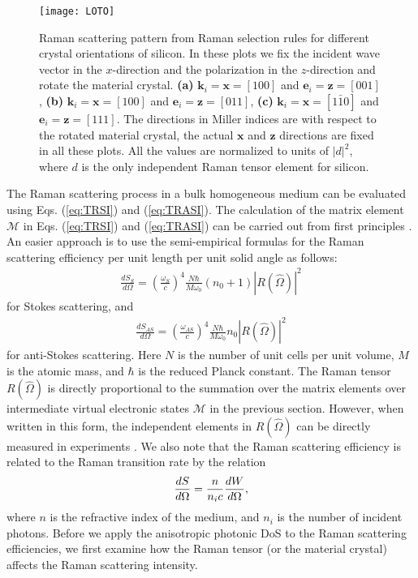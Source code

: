 \documentclass[%
 reprint,
superscriptaddress,
 amsmath,amssymb,
 aps,
pra,
]{revtex4-1}
\newcommand{\mb}[1]{\mathbf{#1}} %
\begin{document}
\begin{figure*}[!ht]
\begin{center}
\texttt{[image: LOTO]}
\caption{Raman scattering pattern from Raman selection rules for different crystal orientations of silicon. In these plots we fix the incident wave vector in the $x$-direction and the polarization in the $z$-direction and rotate the material crystal. \textbf{(a)} $\mb{k}_i=\mb{x}=[100]$ and $\mb{e}_i=\mb{z}=[001]$,
\textbf{(b)} $\mb{k}_i=\mb{x}=[100]$ and $\mb{e}_i=\mb{z}=[011]$,
\textbf{(c)} $\mb{k}_i=\mb{x}=[1\bar{1}0]$ and $\mb{e}_i=\mb{z}=[111]$. The directions in Miller indices are with respect to the rotated material crystal, the actual $\mb{x}$ and $\mb{z}$ directions are fixed in all these plots. All the values are normalized to units of $|d|^2$, where $d$ is the only independent Raman tensor element for silicon.}
\label{fig:LOTO}
\end{center}
\end{figure*}




The Raman scattering process in a bulk homogeneous medium can be evaluated using Eqs. (\ref{eq:TRSI}) and (\ref{eq:TRASI}). The calculation of the matrix element $\mathcal{M}$ in Eqs. (\ref{eq:TRSI}) and (\ref{eq:TRASI}) can be carried out from first principles \cite{deinzer2002raman,lazzeri2003first}. An easier approach is to use the semi-empirical formulas for the Raman scattering efficiency per unit length per unit solid angle \cite{aggarwal2011measurement,chen2015raman,wagner1983absolute} as follows:
\begin{align}\label{eq:dSdOS}
\frac{d S_S}{d\Omega}
	=\left (\frac{\omega_S}{c} \right )^4
	\frac{N\hbar}{M\omega_0}(n_0+1)
	|R(\hat{\Omega})|^2
\end{align}
for Stokes scattering, and
\begin{align}\label{eq:dSdOAS}
\frac{d S_{AS}}{d\Omega}
	=\left (\frac{\omega_{AS}}{c} \right )^4
	\frac{N\hbar}{M\omega_0}n_0
	|R(\hat{\Omega})|^2
\end{align}
for anti-Stokes scattering. Here $N$ is the number of unit cells per unit volume, $M$ is the atomic mass, and $\hbar$ is the reduced Planck constant. The Raman tensor $R(\hat{\Omega})$ is directly proportional to the summation over the matrix elements over intermediate virtual electronic states $\mathcal{M}$ in the previous section. However, when written in this form, the independent elements in $R(\hat{\Omega})$ can be directly measured in experiments \cite{loudon1963theory,loudon1964raman,yu1996fundamentals}.
We also note that the Raman scattering efficiency is related to the Raman transition rate by the relation \cite{loudon1963theory}
\begin{align}
\frac{d S}{d\Omega}= \frac{n}{n_i c}\frac{d W}{d\Omega},\notag
\end{align}
where $n$ is the refractive index of the medium, and $n_i$ is the number of incident photons. Before we apply the anisotropic photonic DoS to the Raman scattering efficiencies, we first examine how the Raman tensor (or the material crystal) affects the Raman scattering intensity. 
\end{document}
